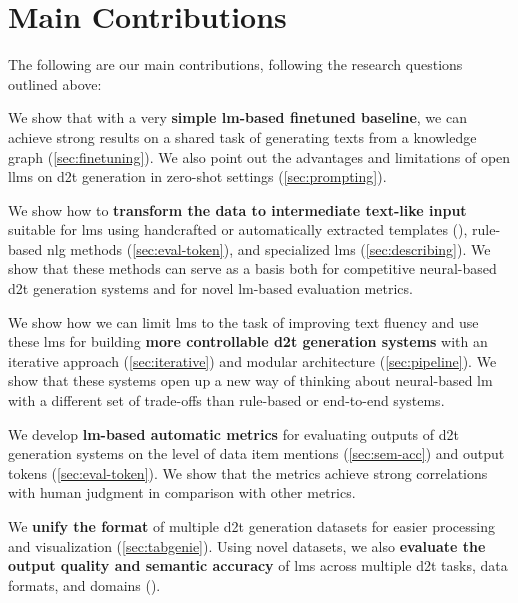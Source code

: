\section{Main Contributions}
\label{sec:contributions}


The following are our main contributions, following the research questions outlined above:

\begin{description}[leftmargin=\widthof{\textbf{Ad RQ1\ \ }}]
    \item[Ad \ref{rq:1}] We show that  with a very \textbf{simple \ac{lm}-based finetuned baseline}, we can achieve strong results on a shared task of generating texts from a knowledge graph (\autoref{sec:finetuning}). We also point out the advantages and limitations of open \acp{llm} on \ac{d2t} generation in zero-shot settings (\autoref{sec:prompting}).
    \item[Ad \ref{rq:2}] We show how to \textbf{transform the data to intermediate text-like input} suitable for \acp{lm} using handcrafted or automatically extracted templates (), rule-based \ac{nlg} methods (\autoref{sec:eval-token}), and specialized \acp{lm} (\autoref{sec:describing}). We show that these methods can serve as a basis both for competitive neural-based \ac{d2t} generation systems and for novel \ac{lm}-based evaluation metrics.
    \item[Ad \ref{rq:3}] We show how we can limit \acp{lm} to the task of improving text fluency and use these \acp{lm} for building \textbf{more controllable \ac{d2t} generation systems} with an iterative approach (\autoref{sec:iterative}) and modular architecture (\autoref{sec:pipeline}). We show that these systems open up a new way of thinking about neural-based \ac{lm} with a different set of trade-offs than rule-based or end-to-end systems.
    \item[Ad \ref{rq:4}] We develop \textbf{\ac{lm}-based automatic metrics} for evaluating outputs of \ac{d2t} generation systems on the level of data item mentions (\autoref{sec:sem-acc}) and output tokens (\autoref{sec:eval-token}). We show that the metrics achieve strong correlations with human judgment in comparison with other metrics.
    \item[Ad \ref{rq:5}] We \textbf{unify the format} of multiple \ac{d2t} generation datasets for easier processing and visualization (\autoref{sec:tabgenie}). Using novel datasets, we also \textbf{evaluate the output quality and semantic accuracy} of \acp{lm} across multiple \ac{d2t} tasks, data formats, and domains ().
\end{description}



